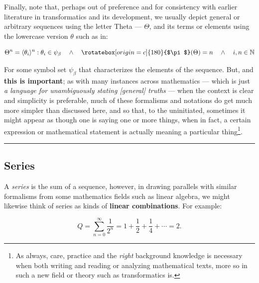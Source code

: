 \documentclass[a4paper, 18pt]{book} %
\newcommand{\invpi}{\rotatebox[origin=c]{180}{$\pi$}}
\begin{document}
\begin{appendices}
\vspace{2em}

Finally, note that, perhaps out of preference and for consistency with earlier literature\cite{Lutalo2024gtnc} in transformatics and its development\cite{adtpaper}\cite{ossipaper}\cite{transformatics}, we usually depict general or arbitrary sequences using the letter Theta --- $\Theta$, and its terms or elements using the lowercase version $\theta$ such as in:

\vspace{2em}

\begin{equation}
\Theta^n = \langle \theta_i \rangle^n : \theta_i \in \psi_\beta \quad \land \quad \invpi(\Theta) = n  \quad \land \quad i,n \in \mathbb{N}
\end{equation}

\vspace{2em}

For some symbol set $\psi_\beta$ that characterizes the elements of the sequence. But, and \textbf{this is important}; as with many instances across mathematics --- which is just \textit{a language for unambiguously stating [general] truths} --- when the context is clear and simplicity is preferable, much of these formalisms and notations do get much more simpler than discussed here, and so that, to the uninitiated, sometimes it might appear as though one is saying one or more things, when in fact, a certain expression or mathematical statement is actually meaning a particular thing\footnote{As always, care, practice and the \textit{right} background knowledge is necessary when both writing and reading or analyzing mathematical texts, more so in such a new field or theory such as transformatics is.}.

\noindent\rule{\textwidth}{0.4pt}


\subsection*{Series}

A \emph{series} is the sum of a sequence\cite{copilot_dna_assistant}, however, in drawing parallels with similar formalisms from some mathematics fields such as linear algebra, we might likewise think of series as kinds of \textbf{linear combinations}. For example:

\vspace{2em}

\begin{equation}
 Q = \sum_{n=0}^{\infty} \frac{1}{2^n} = 1 + \frac{1}{2} + \frac{1}{4} + \cdots = 2.
\end{equation}


\end{appendices}
\end{document}
